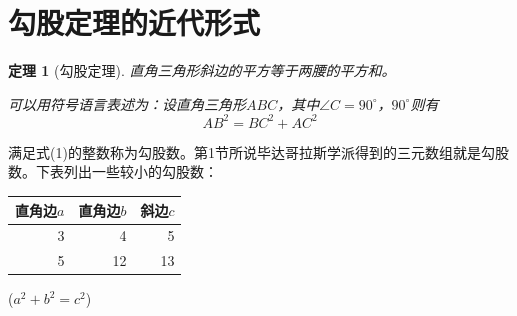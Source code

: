 \documentclass[UTF8]{ctexart}  %
\newtheorem{thm}{定理}
\newcommand\degree{^\circ}
\begin{document}
	\section{勾股定理的近代形式}
	\begin{thm}[勾股定理]
		直角三角形斜边的平方等于两腰的平方和。
		
		可以用符号语言表述为：设直角三角形$ABC$，其中$\angle C=90^\circ$，$90\degree$则有
		\begin{equation}
			AB^2=BC^2+AC^2
		\end{equation}
	\end{thm}
	满足式(1)的整数称为勾股数。第1节所说毕达哥拉斯学派得到的三元数组就是勾股数。下表列出一些较小的勾股数：
	\begin{table}[H]
		\begin{tabular}{|rrr|}
			\hline
			直角边$a$ & 直角边$b$ & 斜边$c$\\
			\hline
			3 & 4 & 5\\
			5 & 12 & 13\\
			\hline
		\end{tabular}
		\quad %
		($a^2+b^2=c^2$)
	\end{table}
	
\end{document}
